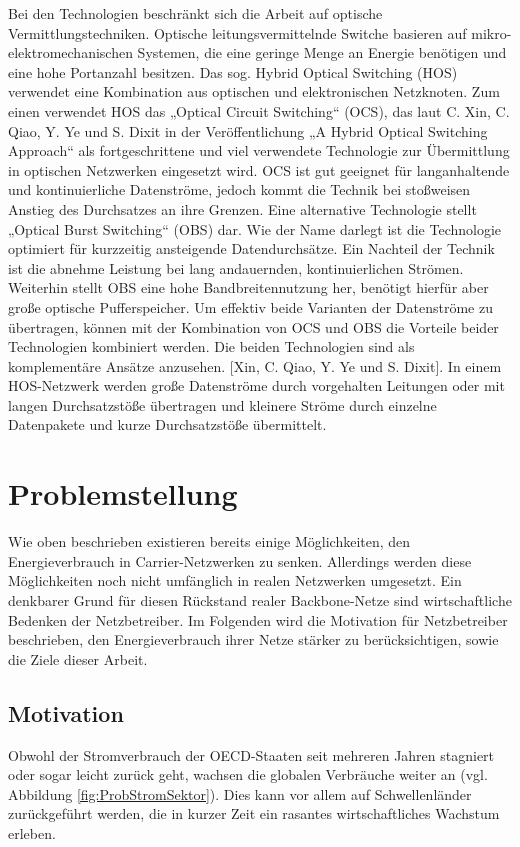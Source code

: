 \documentclass[12pt,titlepage]{article}
\begin{document}
Bei den Technologien beschränkt sich die Arbeit auf optische Vermittlungstechniken. Optische leitungsvermittelnde Switche basieren auf mikro-elektromechanischen Systemen, die eine geringe Menge an Energie benötigen und eine hohe Portanzahl besitzen. Das sog. Hybrid Optical Switching (HOS) verwendet eine Kombination aus optischen und elektronischen Netzknoten. Zum einen verwendet HOS das „Optical Circuit Switching“ (OCS), das laut C. Xin, C. Qiao, Y. Ye und S. Dixit in der Veröffentlichung „A Hybrid Optical Switching Approach“ als fortgeschrittene und viel verwendete Technologie zur Übermittlung in optischen Netzwerken eingesetzt wird. OCS ist gut geeignet für langanhaltende und kontinuierliche Datenströme, jedoch kommt die Technik bei stoßweisen Anstieg des Durchsatzes an ihre Grenzen. Eine alternative Technologie stellt „Optical Burst Switching“ (OBS) dar. Wie der Name darlegt ist die Technologie optimiert für kurzzeitig ansteigende Datendurchsätze. Ein Nachteil der Technik ist die abnehme Leistung bei lang andauernden, kontinuierlichen Strömen. Weiterhin stellt OBS eine hohe Bandbreitennutzung her, benötigt hierfür aber große optische Pufferspeicher. Um effektiv beide Varianten der Datenströme zu übertragen, können mit der Kombination von OCS und OBS die Vorteile beider Technologien kombiniert werden. Die beiden Technologien sind als komplementäre Ansätze anzusehen. [Xin, C. Qiao, Y. Ye und S. Dixit]. In einem HOS-Netzwerk werden große Datenströme durch vorgehalten Leitungen oder mit langen Durchsatzstöße übertragen und kleinere Ströme durch einzelne Datenpakete und kurze Durchsatzstöße übermittelt.


\section{Problemstellung}
Wie oben beschrieben existieren bereits einige Möglichkeiten, den Energieverbrauch in Carrier-Netzwerken zu senken. Allerdings werden diese Möglichkeiten noch nicht umfänglich in realen Netzwerken umgesetzt. Ein denkbarer Grund für diesen Rückstand realer Backbone-Netze sind wirtschaftliche Bedenken der Netzbetreiber. Im Folgenden wird die Motivation für Netzbetreiber beschrieben, den Energieverbrauch ihrer Netze stärker zu berücksichtigen, sowie die Ziele dieser Arbeit.

\subsection{Motivation}
Obwohl der Stromverbrauch der OECD-Staaten seit mehreren Jahren stagniert oder sogar leicht zurück geht, wachsen die globalen Verbräuche weiter an (vgl. Abbildung \ref{fig:ProbStromSektor}). Dies kann vor allem auf  Schwellenländer zurückgeführt werden, die in kurzer Zeit ein rasantes wirtschaftliches Wachstum erleben.
\end{document}

